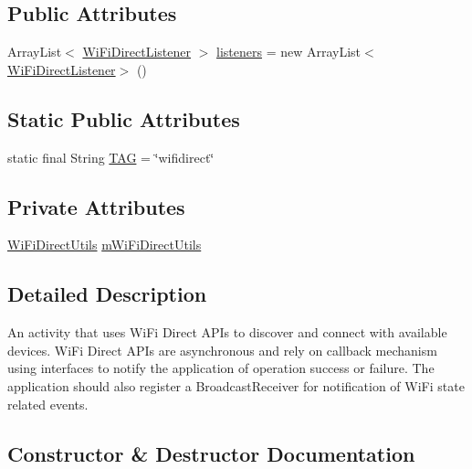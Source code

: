 \subsection*{Public Attributes}
\begin{DoxyCompactItemize}
\item 
Array\+List$<$ \hyperlink{interfacecom_1_1copelabs_1_1oiframework_1_1wifi_1_1_wi_fi_direct_listener}{Wi\+Fi\+Direct\+Listener} $>$ \hyperlink{classcom_1_1copelabs_1_1oiframework_1_1wifi_1_1_wi_fi_direct_a16e049c40f30d1043dd4ce8af55e4e61}{listeners} = new Array\+List$<$\hyperlink{interfacecom_1_1copelabs_1_1oiframework_1_1wifi_1_1_wi_fi_direct_listener}{Wi\+Fi\+Direct\+Listener}$>$ ()
\end{DoxyCompactItemize}
\subsection*{Static Public Attributes}
\begin{DoxyCompactItemize}
\item 
static final String \hyperlink{classcom_1_1copelabs_1_1oiframework_1_1wifi_1_1_wi_fi_direct_a57ef5d26ffbe7ab928d3efe5b196a3e9}{T\+A\+G} = \char`\"{}wifidirect\char`\"{}
\end{DoxyCompactItemize}
\subsection*{Private Attributes}
\begin{DoxyCompactItemize}
\item 
\hyperlink{classcom_1_1copelabs_1_1oiframework_1_1wifi_1_1_wi_fi_direct_utils}{Wi\+Fi\+Direct\+Utils} \hyperlink{classcom_1_1copelabs_1_1oiframework_1_1wifi_1_1_wi_fi_direct_af6b18480c81d0be383f27cbb3b94bd08}{m\+Wi\+Fi\+Direct\+Utils}
\end{DoxyCompactItemize}


\subsection{Detailed Description}
An activity that uses Wi\+Fi Direct A\+P\+Is to discover and connect with available devices. Wi\+Fi Direct A\+P\+Is are asynchronous and rely on callback mechanism using interfaces to notify the application of operation success or failure. The application should also register a Broadcast\+Receiver for notification of Wi\+Fi state related events. 

\subsection{Constructor \& Destructor Documentation}
\hypertarget{classcom_1_1copelabs_1_1oiframework_1_1wifi_1_1_wi_fi_direct_a32ca6cda80db63c97377c6d12fdab8dc}{}
